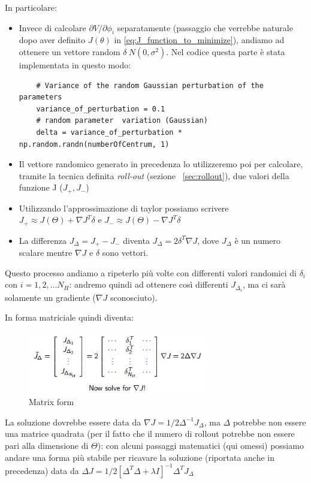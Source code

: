 In particolare:
\begin{itemize}
	\item Invece di calcolare $\partial V / \partial\phi_i$ separatamente (passaggio che verrebbe naturale dopo aver definito $J(\theta)$ in \ref{eq:J_function_to_minimize}), andiamo ad ottenere un vettore random $\delta ~ N (0, \sigma^2)$.
	Nel codice questa parte è stata implementata in questo modo:
	\begin{lstlisting}
	# Variance of the random Gaussian perturbation of the parameters
	variance_of_perturbation = 0.1 
	# random parameter 	variation (Gaussian)
	delta = variance_of_perturbation * np.random.randn(numberOfCentrum, 1) 
	\end{lstlisting}
	\item Il vettore randomico generato in precedenza lo utilizzeremo poi per calcolare, tramite la tecnica definita \textit{roll-out} (sezione ~\ref{sec:rollout}), due valori della funzione J ($J_+, J_-$)
	\item Utilizzando l'approssimazione di taylor possiamo scrivere $J_+ \approx J(\Theta) + \nabla J^T \delta$ e $J_- \approx J(\Theta) - \nabla J^T \delta$
	\item La differenza $J_\Delta = J_+ - J_-$ diventa $J_\Delta = 2 \delta^T \nabla J$, dove $J_\Delta$ è un numero scalare mentre $\nabla J$ e $\delta$ sono vettori.
\end{itemize}

Questo processo andiamo a ripeterlo più volte con differenti valori randomici di $\delta_i$ con $i= 1,2,...N_H$: andremo quindi ad ottenere così differenti $J_{\Delta_i}$, ma ci sarà solamente un gradiente ($\nabla J$ sconosciuto).

In forma matriciale quindi diventa:
\begin{figure}[h!]
	\centering
	\includegraphics[width=0.7\textwidth]{Immagini/Matrix_form.JPG}
	\caption{Matrix form}
	\label{fig:matrix_form}
\end{figure}
La soluzione dovrebbe essere data da $\nabla J = 1/2 \Delta^{-1} J_\Delta$, ma $\Delta$
potrebbe non essere una matrice quadrata (per il fatto che il numero di rollout potrebbe non essere pari alla dimensione di $\Theta$): con alcuni passaggi matematici (qui omessi) possiamo andare una forma più stabile per ricavare la soluzione (riportata anche in precedenza) data da $\Delta J = 1/2 [\Delta^T \Delta +\lambda I]^{-1} \Delta^T J_\Delta$
\newpage
